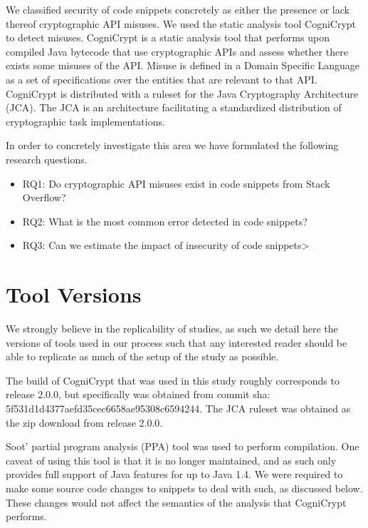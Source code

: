 \documentclass[10pt, conference]{IEEEtran}
\begin{document}
We classified security of code snippets concretely as either the presence or lack thereof cryptographic API misuses. We used the static analysis tool CogniCrypt \cite{krger_et_al:LIPIcs:2018:9215} to detect misuses. CogniCrypt is a static analysis tool that performs upon compiled Java bytecode that use cryptographic APIs and assess whether there exists some misuses of the API. Misuse is defined in a Domain Specific Language as a set of specifications over the entities that are relevant to that API. CogniCrypt is distributed with a ruleset for the Java Cryptography Architecture (JCA). The JCA is an architecture facilitating a standardized distribution of cryptographic task implementations.

In order to concretely investigate this area we have formulated the following research questions.


\begin{itemize}
\item  RQ1: Do cryptographic API misuses exist in code snippets from Stack Overflow?

\item  RQ2: What is the most common error detected in code snippets?

\item  RQ3: Can we estimate the impact of insecurity of code snippets>

\end{itemize}

\section{Tool Versions}

We strongly believe in the replicability of studies, as such we detail here the versions of tools used in our process such that any interested reader should be able to replicate as much of the setup of the study as possible.

The build of CogniCrypt that was used in this study roughly corresponds to release 2.0.0, but specifically was obtained from commit sha: 5f531d1d4377aefd35cec6658ae95308c6594244. The JCA ruleset was obtained as the zip download from release 2.0.0. 

Soot' partial program analysis (PPA) tool \cite{SootPPA} was used to perform compilation. One caveat of using this tool is that it is no longer maintained, and as such only provides full support of Java features for up to Java 1.4. We were required to make some source code changes to snippets to deal with such, as discussed below. These changes would not affect the semantics of the analysis that CogniCrypt performs.
\end{document}
